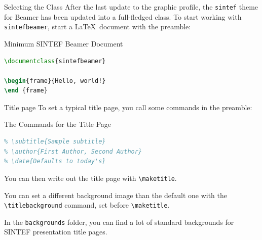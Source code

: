 
\begin{frame}[fragile]{Selecting the Class}
After the last update to the graphic profile, the \texttt{sintef} theme for
Beamer has been updated into a full-fledged class.
To start working with \texttt{sintefbeamer}, start a \LaTeX\ document with the
preamble:
\begin{block}{Minimum SINTEF Beamer Document}
\begin{lstlisting}[language=TeX]
\documentclass{sintefbeamer}

\begin{frame}{Hello, world!}
\end {frame}

\end{lstlisting}
\end{block}
\end{frame}

\begin{frame}[fragile]{Title page}
To set a typical title page, you call some commands in the preamble:
\begin{block}{The Commands for the Title Page}
\begin{lstlisting}[language=TeX]
% \title{Sample Title}
% \subtitle{Sample subtitle}
% \author{First Author, Second Author}
% \date{Defaults to today's}
\end{lstlisting}

\end{block}
You can then write out the title page with \verb|\maketitle|.

You can set a different background image than the default one with the
\verb|\titlebackground| command, set before \verb|\maketitle|.

In the \texttt{backgrounds} folder, you can find a lot of standard backgrounds
for SINTEF presentation title pages.

\end{frame}

